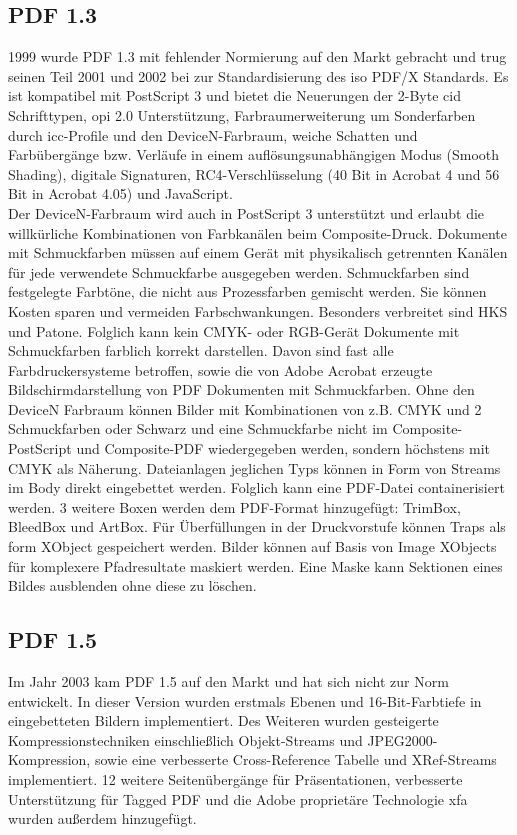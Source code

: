 \subsection{PDF 1.3}
1999 wurde PDF 1.3 mit fehlender Normierung auf den Markt gebracht und trug seinen Teil 2001 und 2002 bei zur Standardisierung des \gls{iso} PDF/X Standards. Es ist kompatibel mit PostScript 3 und bietet die Neuerungen der 2-Byte \gls{cid} Schrifttypen, \gls{opi} 2.0 Unterstützung, Farbraumerweiterung um Sonderfarben durch \gls{icc}-Profile und den DeviceN-Farbraum, weiche Schatten und Farbübergänge bzw. Verläufe in einem auflösungsunabhängigen Modus (Smooth Shading), digitale Signaturen, RC4-Verschlüsselung (40 Bit in Acrobat 4 und 56 Bit in Acrobat 4.05) und JavaScript. \\ \cite{proj-consult, schneeberger} 
Der DeviceN-Farbraum wird auch in PostScript 3 unterstützt und erlaubt die willkürliche Kombinationen von Farbkanälen beim Composite-Druck. Dokumente mit Schmuckfarben müssen auf einem Gerät mit physikalisch getrennten Kanälen für jede verwendete Schmuckfarbe ausgegeben werden. Schmuckfarben sind festgelegte Farbtöne, die nicht aus Prozessfarben gemischt werden. Sie können Kosten sparen und vermeiden Farbschwankungen. Besonders verbreitet sind HKS und Patone. \cite{kompendium} Folglich kann kein CMYK- oder RGB-Gerät Dokumente mit Schmuckfarben farblich korrekt darstellen. Davon sind fast alle Farbdruckersysteme betroffen, sowie die von Adobe Acrobat erzeugte Bildschirmdarstellung von PDF Dokumenten mit Schmuckfarben. Ohne den DeviceN Farbraum können Bilder mit Kombinationen von z.B. CMYK und 2 Schmuckfarben oder Schwarz und eine Schmuckfarbe nicht im Composite-PostScript und Composite-PDF wiedergegeben werden, sondern höchstens mit CMYK als Näherung. \cite{helios} 
Dateianlagen jeglichen Typs können in Form von Streams im Body direkt eingebettet werden. Folglich kann eine PDF-Datei containerisiert werden. 3 weitere Boxen werden dem PDF-Format hinzugefügt: TrimBox, BleedBox und ArtBox. Für Überfüllungen in der Druckvorstufe können Traps als form XObject gespeichert werden. Bilder können auf Basis von Image XObjects für komplexere Pfadresultate maskiert werden. Eine Maske kann Sektionen eines Bildes ausblenden ohne diese zu löschen.
\cite{schneeberger}

\subsection{PDF 1.5}
Im Jahr 2003 kam PDF 1.5 auf den Markt und hat sich nicht zur Norm entwickelt. In dieser Version wurden erstmals Ebenen und 16-Bit-Farbtiefe in eingebetteten Bildern implementiert. Des Weiteren wurden gesteigerte Kompressionstechniken einschließlich Objekt-Streams und JPEG2000-Kompression, sowie eine verbesserte Cross-Reference Tabelle und XRef-Streams implementiert. 12 weitere Seitenübergänge für Präsentationen, verbesserte Unterstützung für Tagged PDF und die Adobe proprietäre Technologie \gls{xfa} wurden außerdem hinzugefügt. \cite{proj-consult, schneeberger} 


